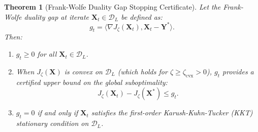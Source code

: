 \documentclass[conference]{IEEEtran}
\newtheorem{theorem}{Theorem}
\begin{document}
\begin{theorem}[Frank-Wolfe Duality Gap Stopping Certificate]
\label{thm:duality_gap}
Let the Frank-Wolfe duality gap at iterate $\mathbf{X}_t \in \mathcal{D}_L$ be defined as:
\begin{equation}
g_t = \big\langle \nabla J_\zeta(\mathbf{X}_t), \mathbf{X}_t - \mathbf{Y}^* \big\rangle.
\label{eq:gt_def}
\end{equation}
Then:
\begin{enumerate}
    \item $g_t \geq 0$ for all $\mathbf{X}_t \in \mathcal{D}_L$.
    \item When $J_\zeta(\mathbf{X})$ is convex on $\mathcal{D}_L$ (which holds for $\zeta \geq \zeta_{\text{cvx}} > 0$), $g_t$ provides a certified upper bound on the global suboptimality:
    \begin{equation}
    J_\zeta(\mathbf{X}_t) - J_\zeta(\mathbf{X}^*) \leq g_t.
    \end{equation}
    \item $g_t = 0$ if and only if $\mathbf{X}_t$ satisfies the first-order Karush-Kuhn-Tucker (KKT) stationary condition on $\mathcal{D}_L$.
\end{enumerate}
\end{theorem}
\end{document}
